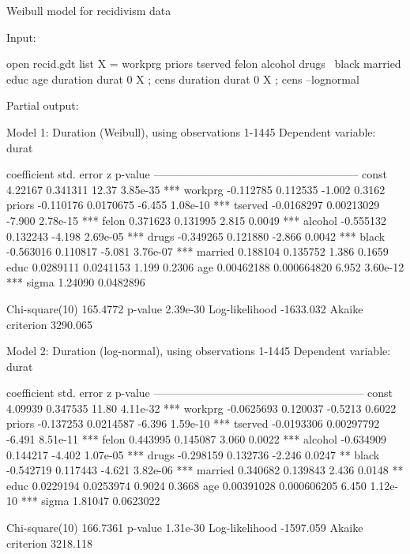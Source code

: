 \begin{script}[htbp]
  \caption{Weibull model for recidivism data}
Input:
\begin{scodebit}
open recid.gdt
list X = workprg priors tserved felon alcohol drugs \
 black married educ age
duration durat 0 X ; cens
duration durat 0 X ; cens --lognormal
\end{scodebit}
Partial output:
\begin{scodebit}
Model 1: Duration (Weibull), using observations 1-1445
Dependent variable: durat

             coefficient   std. error      z      p-value 
  --------------------------------------------------------
  const       4.22167      0.341311      12.37    3.85e-35 ***
  workprg    -0.112785     0.112535      -1.002   0.3162  
  priors     -0.110176     0.0170675     -6.455   1.08e-10 ***
  tserved    -0.0168297    0.00213029    -7.900   2.78e-15 ***
  felon       0.371623     0.131995       2.815   0.0049   ***
  alcohol    -0.555132     0.132243      -4.198   2.69e-05 ***
  drugs      -0.349265     0.121880      -2.866   0.0042   ***
  black      -0.563016     0.110817      -5.081   3.76e-07 ***
  married     0.188104     0.135752       1.386   0.1659  
  educ        0.0289111    0.0241153      1.199   0.2306  
  age         0.00462188   0.000664820    6.952   3.60e-12 ***
  sigma       1.24090      0.0482896                      

Chi-square(10)       165.4772   p-value              2.39e-30
Log-likelihood      -1633.032   Akaike criterion     3290.065

Model 2: Duration (log-normal), using observations 1-1445
Dependent variable: durat

             coefficient   std. error       z      p-value 
  ---------------------------------------------------------
  const       4.09939      0.347535      11.80     4.11e-32 ***
  workprg    -0.0625693    0.120037      -0.5213   0.6022  
  priors     -0.137253     0.0214587     -6.396    1.59e-10 ***
  tserved    -0.0193306    0.00297792    -6.491    8.51e-11 ***
  felon       0.443995     0.145087       3.060    0.0022   ***
  alcohol    -0.634909     0.144217      -4.402    1.07e-05 ***
  drugs      -0.298159     0.132736      -2.246    0.0247   **
  black      -0.542719     0.117443      -4.621    3.82e-06 ***
  married     0.340682     0.139843       2.436    0.0148   **
  educ        0.0229194    0.0253974      0.9024   0.3668  
  age         0.00391028   0.000606205    6.450    1.12e-10 ***
  sigma       1.81047      0.0623022                       

Chi-square(10)       166.7361   p-value              1.31e-30
Log-likelihood      -1597.059   Akaike criterion     3218.118

\end{scodebit}
\label{ex:duration1}
\end{script}

